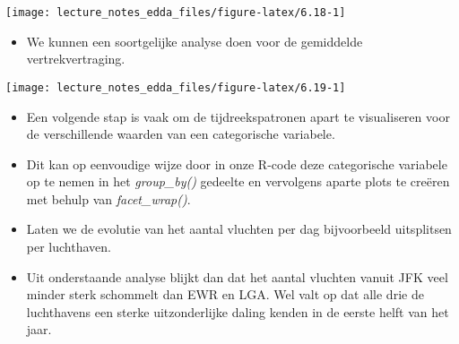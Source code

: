 \documentclass[]{memoir}
\newenvironment{Shaded}{\begin{snugshade}}{\end{snugshade}}
\newcommand{\KeywordTok}[1]{\textcolor[rgb]{0.13,0.29,0.53}{\textbf{#1}}}
\newcommand{\DataTypeTok}[1]{\textcolor[rgb]{0.13,0.29,0.53}{#1}}
\newcommand{\StringTok}[1]{\textcolor[rgb]{0.31,0.60,0.02}{#1}}
\newcommand{\OperatorTok}[1]{\textcolor[rgb]{0.81,0.36,0.00}{\textbf{#1}}}
\newcommand{\NormalTok}[1]{#1}
\providecommand{\tightlist}{%
  \setlength{\itemsep}{0pt}\setlength{\parskip}{0pt}}
\begin{document}
\begin{Shaded}
\end{Shaded}

\texttt{[image: lecture\_notes\_edda\_files/figure-latex/6.18-1]}

\begin{itemize}
\tightlist
\item
  We kunnen een soortgelijke analyse doen voor de gemiddelde
  vertrekvertraging.
\end{itemize}

\begin{Shaded}
\end{Shaded}

\texttt{[image: lecture\_notes\_edda\_files/figure-latex/6.19-1]}

\begin{itemize}
\tightlist
\item
  Een volgende stap is vaak om de tijdreekspatronen apart te
  visualiseren voor de verschillende waarden van een categorische
  variabele.
\item
  Dit kan op eenvoudige wijze door in onze R-code deze categorische
  variabele op te nemen in het \emph{group\_by()} gedeelte en vervolgens
  aparte plots te creëren met behulp van \emph{facet\_wrap()}.
\item
  Laten we de evolutie van het aantal vluchten per dag bijvoorbeeld
  uitsplitsen per luchthaven.
\item
  Uit onderstaande analyse blijkt dan dat het aantal vluchten vanuit JFK
  veel minder sterk schommelt dan EWR en LGA. Wel valt op dat alle drie
  de luchthavens een sterke uitzonderlijke daling kenden in de eerste
  helft van het jaar.
\end{itemize}
\end{document}
